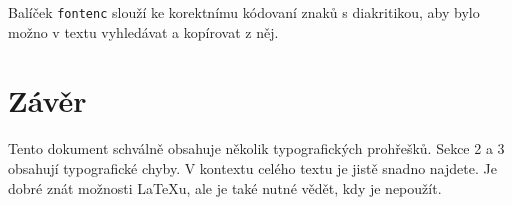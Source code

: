 \documentclass[a4paper,10pt,twocolumn]{article}
\begin{document}
Balíček  \verb|fontenc| slouží ke korektnímu kódovaní znaků s diakritikou, aby bylo možno v textu vyhledávat a kopírovat z něj.

\section{Závěr}
Tento dokument schválně obsahuje několik typografických prohřešků. Sekce 2 a 3 obsahují typografické chyby. V kontextu celého textu je jistě snadno najdete. Je dobré znát možnosti \LaTeX u, ale je také nutné vědět, kdy je nepoužít.
\end{document}
